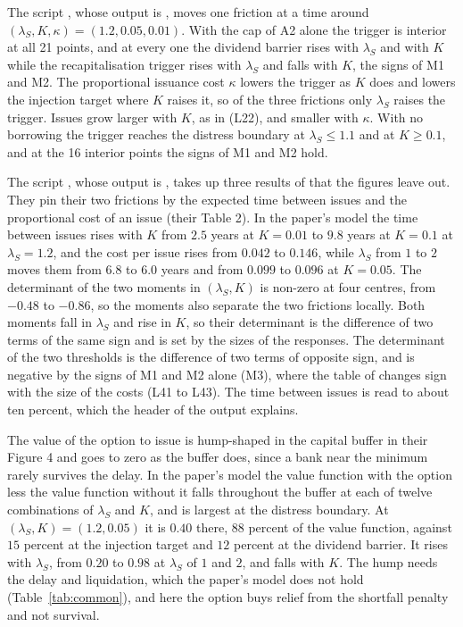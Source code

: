 The script , whose output is
, moves one friction at a time around $(\lambda_S,K,\kappa)=(1.2,0.05,0.01)$. With the cap of A2 alone
the trigger is interior at all 21 points, and at every one the dividend
barrier rises with $\lambda_S$ and with $K$ while the recapitalisation trigger
rises with $\lambda_S$ and falls with $K$, the signs of M1 and M2. The
proportional issuance cost $\kappa$ lowers the trigger as $K$ does and lowers
the injection target where $K$ raises it, so of the three frictions only
$\lambda_S$ raises the trigger. Issues grow larger with $K$, as in
\citet{peura2006} (L22), and smaller with $\kappa$. With no borrowing the
trigger reaches the distress boundary at $\lambda_S\le1.1$ and at $K\ge0.1$,
and at the 16 interior points the signs of M1 and M2 hold.

The script , whose output is
, takes up three results of
\citet{peura2006} that the figures leave out. They pin their two frictions by
the expected time between issues and the proportional cost of an issue (their
Table 2). In the paper's model the time between issues rises with $K$ from
$2.5$ years at $K=0.01$ to $9.8$ years at $K=0.1$ at $\lambda_S=1.2$, and the
cost per issue rises from $0.042$ to $0.146$, while $\lambda_S$ from $1$ to $2$
moves them from $6.8$ to $6.0$ years and from $0.099$ to $0.096$ at $K=0.05$.
The determinant of the two moments in $(\lambda_S,K)$ is non-zero at four
centres, from $-0.48$ to $-0.86$, so the moments also separate the two
frictions locally. Both moments fall in $\lambda_S$ and rise in $K$, so their
determinant is the difference of two terms of the same sign and is set by the
sizes of the responses. The determinant of the two thresholds is the difference
of two terms of opposite sign, and is negative by the signs of M1 and M2 alone
(M3), where the table of \citet{peura2006} changes sign with the size of the
costs (L41 to L43). The time between issues is read to about ten percent, which
the header of the output explains.

The value of the option to issue is hump-shaped in the capital buffer in their
Figure 4 and goes to zero as the buffer does, since a bank near the minimum
rarely survives the delay. In the paper's model the value function with the
option less the value function without it falls throughout the buffer at each
of twelve combinations of $\lambda_S$ and $K$, and is largest at the distress
boundary. At $(\lambda_S,K)=(1.2,0.05)$ it is $0.40$ there, $88$ percent of the
value function, against $15$ percent at the injection target and $12$ percent
at the dividend barrier. It rises with $\lambda_S$, from $0.20$ to $0.98$ at
$\lambda_S$ of $1$ and $2$, and falls with $K$. The hump needs the delay and
liquidation, which the paper's model does not hold (Table~\ref{tab:common}),
and here the option buys relief from the shortfall penalty and not survival.

